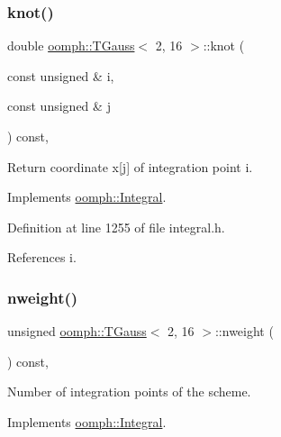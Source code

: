 \subsubsection{\texorpdfstring{knot()}{knot()}}
{\footnotesize\ttfamily double \hyperlink{classoomph_1_1TGauss}{oomph\+::\+T\+Gauss}$<$ 2, 16 $>$\+::knot (\begin{DoxyParamCaption}\item[{const unsigned \&}]{i,  }\item[{const unsigned \&}]{j }\end{DoxyParamCaption}) const\hspace{0.3cm}{\ttfamily [inline]}, {\ttfamily [virtual]}}



Return coordinate x\mbox{[}j\mbox{]} of integration point i. 



Implements \hyperlink{classoomph_1_1Integral_a1a2122f99a87c18649bafdd9ed739758}{oomph\+::\+Integral}.



Definition at line 1255 of file integral.\+h.



References i.

\mbox{\label{classoomph_1_1TGauss_3_012_00_0116_01_4_a335d1b99d6ca64077a6286347b4101a9}} 
\subsubsection{\texorpdfstring{nweight()}{nweight()}}
{\footnotesize\ttfamily unsigned \hyperlink{classoomph_1_1TGauss}{oomph\+::\+T\+Gauss}$<$ 2, 16 $>$\+::nweight (\begin{DoxyParamCaption}{ }\end{DoxyParamCaption}) const\hspace{0.3cm}{\ttfamily [inline]}, {\ttfamily [virtual]}}



Number of integration points of the scheme. 



Implements \hyperlink{classoomph_1_1Integral_a1a270de9d99a1fcf1d25a6c1017f65fa}{oomph\+::\+Integral}.



